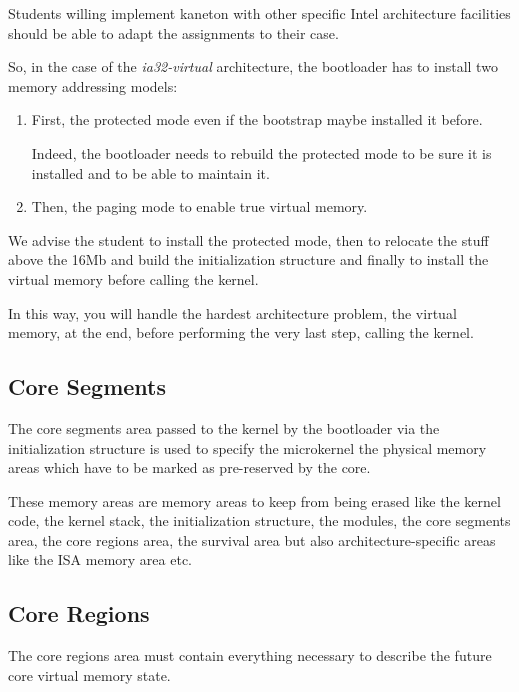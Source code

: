 Students willing implement kaneton with other specific Intel architecture
facilities should be able to adapt the assignments to their case.

So, in the case of the \textit{ia32-virtual} architecture, the bootloader
has to install two memory addressing models:

\begin{enumerate}
  \item
    First, the protected mode even if the bootstrap maybe installed it
    before.

    Indeed, the bootloader needs to rebuild the protected mode to be sure
    it is installed and to be able to maintain it.
  \item
    Then, the paging mode to enable true virtual memory.
\end{enumerate}

We advise the student to install the protected mode, then to relocate the
stuff above the 16Mb and build the initialization structure and finally to install the
virtual memory before calling the kernel.

In this way, you will handle the hardest architecture problem, the virtual
memory, at the end, before performing the very last step, calling the kernel.

%
%

\subsection{Core Segments}

The core segments area passed to the kernel by the bootloader via
the initialization structure is used to specify the microkernel the
physical memory areas which have to be marked as pre-reserved by the core.

These memory areas are memory areas to keep from being erased like the
kernel code, the kernel stack, the initialization structure, the modules,
the core segments area, the core regions area, the survival area but also
architecture-specific areas like the ISA memory area etc.

%
%

\subsection{Core Regions}

The core regions area must contain everything necessary to describe
the future core virtual memory state.

